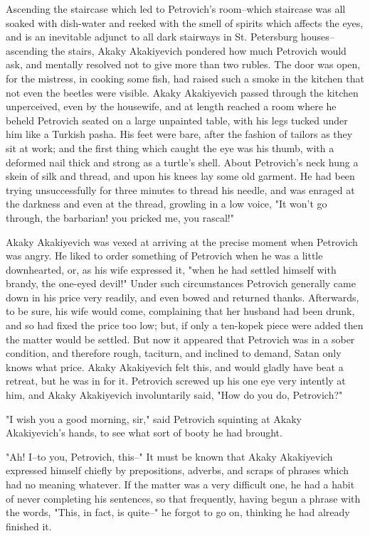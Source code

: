 Ascending the staircase which led to Petrovich's room--which staircase
was all soaked with dish-water and reeked with the smell of spirits
which affects the eyes, and is an inevitable adjunct to all dark
stairways in St. Petersburg houses--ascending the stairs, Akaky
Akakiyevich pondered how much Petrovich would ask, and mentally
resolved not to give more than two rubles. The door was open, for the
mistress, in cooking some fish, had raised such a smoke in the kitchen
that not even the beetles were visible. Akaky Akakiyevich passed
through the kitchen unperceived, even by the housewife, and at length
reached a room where he beheld Petrovich seated on a large unpainted
table, with his legs tucked under him like a Turkish pasha. His feet
were bare, after the fashion of tailors as they sit at work; and the
first thing which caught the eye was his thumb, with a deformed nail
thick and strong as a turtle's shell. About Petrovich's neck hung a
skein of silk and thread, and upon his knees lay some old garment. He
had been trying unsuccessfully for three minutes to thread his needle,
and was enraged at the darkness and even at the thread, growling in a
low voice, "It won't go through, the barbarian! you pricked me, you
rascal!"

Akaky Akakiyevich was vexed at arriving at the precise moment when
Petrovich was angry. He liked to order something of Petrovich when he
was a little downhearted, or, as his wife expressed it, "when he had
settled himself with brandy, the one-eyed devil!" Under such
circumstances Petrovich generally came down in his price very readily,
and even bowed and returned thanks. Afterwards, to be sure, his wife
would come, complaining that her husband had been drunk, and so had
fixed the price too low; but, if only a ten-kopek piece were added
then the matter would be settled. But now it appeared that Petrovich
was in a sober condition, and therefore rough, taciturn, and inclined
to demand, Satan only knows what price. Akaky Akakiyevich felt this,
and would gladly have beat a retreat, but he was in for it. Petrovich
screwed up his one eye very intently at him, and Akaky Akakiyevich
involuntarily said, "How do you do, Petrovich?"

"I wish you a good morning, sir," said Petrovich squinting at Akaky
Akakiyevich's hands, to see what sort of booty he had brought.

"Ah! I--to you, Petrovich, this--" It must be known that Akaky
Akakiyevich expressed himself chiefly by prepositions, adverbs, and
scraps of phrases which had no meaning whatever. If the matter was a
very difficult one, he had a habit of never completing his sentences,
so that frequently, having begun a phrase with the words, "This, in
fact, is quite--" he forgot to go on, thinking he had already finished
it.

